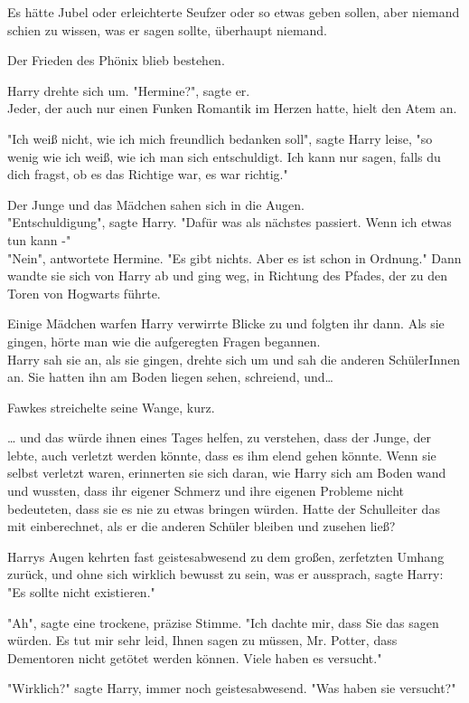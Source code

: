 {Es hätte Jubel oder erleichterte Seufzer oder so etwas geben sollen, aber niemand schien zu wissen, was er sagen sollte, überhaupt niemand.

Der Frieden des Phönix blieb bestehen.

Harry drehte sich um. "Hermine?", sagte er.\\ Jeder, der auch nur einen Funken Romantik im Herzen hatte, hielt den Atem an.

"Ich weiß nicht, wie ich mich freundlich bedanken soll", sagte Harry leise, "so wenig wie ich weiß, wie ich man sich entschuldigt. Ich kann nur sagen, falls du dich fragst, ob es das Richtige war, es war richtig."

Der Junge und das Mädchen sahen sich in die Augen.\\ "Entschuldigung", sagte Harry. "Dafür was als nächstes passiert. Wenn ich etwas tun kann -"\\ "Nein", antwortete Hermine. "Es gibt nichts. Aber es ist schon in Ordnung." Dann wandte sie sich von Harry ab und ging weg, in Richtung des Pfades, der zu den Toren von Hogwarts führte.

Einige Mädchen warfen Harry verwirrte Blicke zu und folgten ihr dann. Als sie gingen, hörte man wie die aufgeregten Fragen begannen.\\ Harry sah sie an, als sie gingen, drehte sich um und sah die anderen SchülerInnen an. Sie hatten ihn am Boden liegen sehen, schreiend, und…

Fawkes streichelte seine Wange, kurz.

… und das würde ihnen eines Tages helfen, zu verstehen, dass der Junge, der lebte, auch verletzt werden könnte, dass es ihm elend gehen könnte. Wenn sie selbst verletzt waren, erinnerten sie sich daran, wie Harry sich am Boden wand und wussten, dass ihr eigener Schmerz und ihre eigenen Probleme nicht bedeuteten, dass sie es nie zu etwas bringen würden. Hatte der Schulleiter das mit einberechnet, als er die anderen Schüler bleiben und zusehen ließ?

Harrys Augen kehrten fast geistesabwesend zu dem großen, zerfetzten Umhang zurück, und ohne sich wirklich bewusst zu sein, was er aussprach, sagte Harry: "Es sollte nicht existieren."

"Ah", sagte eine trockene, präzise Stimme. "Ich dachte mir, dass Sie das sagen würden. Es tut mir sehr leid, Ihnen sagen zu müssen, Mr. Potter, dass Dementoren nicht getötet werden können. Viele haben es versucht."

"Wirklich?" sagte Harry, immer noch geistesabwesend. "Was haben sie versucht?"

}
